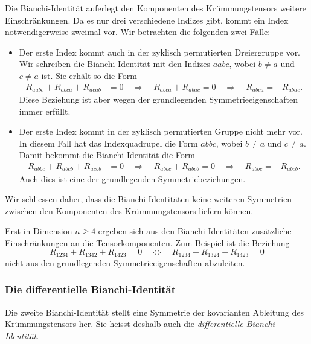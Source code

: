 Die Bianchi-Identität auferlegt den Komponenten des Krümmungstensors
weitere Einschränkungen.
Da es nur drei verschiedene Indizes gibt, kommt ein Index notwendigerweise
zweimal vor.
Wir betrachten die folgenden zwei Fälle:
\begin{itemize}
\item
Der erste Index kommt auch in der zyklisch permutierten
Dreiergruppe vor.
Wir schreiben die Bianchi-Identität mit den Indizes $aabc$,
wobei $b\ne a$ und $c\ne a$ ist.
Sie erhält so die Form
\begin{align*}
R_{aabc}
+
R_{abca}
+
R_{acab}
&=
0
\quad
\Rightarrow
\quad
R_{abca}
+
R_{abac}
=
0
\quad\Rightarrow\quad
R_{abca} = -R_{abac}.
\end{align*}
Diese Beziehung ist aber wegen der grundlegenden Symmetrieeigenschaften
immer erfüllt.
\item
Der erste Index kommt in der zyklisch permutierten Gruppe nicht mehr vor.
In diesem Fall hat das Indexquadrupel die Form $abbc$, wobei $b\ne a$ und
$c\ne a$.
Damit bekommt die Bianchi-Identität die Form
\begin{align*}
R_{abbc}
+
R_{abcb}
+
R_{acbb}
&=
0
\quad \Rightarrow\quad
R_{abbc}
+
R_{abcb}
=
0
\quad\Rightarrow\quad
R_{abbc} = -R_{abcb}.
\end{align*}
Auch dies ist eine der grundlegenden Symmetriebeziehungen.
\end{itemize}
Wir schliessen daher, dass die Bianchi-Identitäten keine weiteren
Symmetrien zwischen den Komponenten des Krümmungstensors liefern
können.

Erst in Dimension $n\ge 4$ ergeben sich aus den Bianchi-Identitäten
zusätzliche Einschränkungen an die Tensorkomponenten.
Zum Beispiel ist die Beziehung
\[
R_{1234}
+
R_{1342}
+
R_{1423}
=
0
\quad\Leftrightarrow\quad
R_{1234}
-
R_{1324}
+
R_{1423}
=
0
\]
nicht aus den grundlegenden Symmetrieeigenschaften abzuleiten.

%
%
\subsubsection{Die differentielle Bianchi-Identität}
Die zweite Bianchi-Identität stellt eine Symmetrie der kovarianten Ableitung
des Krümmungstensors her.
%
%
Sie heisst deshalb auch die \emph{differentielle Bianchi-Identität}.
%
%

